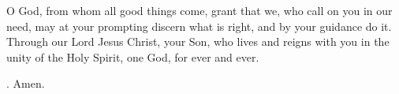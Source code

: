 \lettrine[lines=3]{O}{} God, from whom all good things come, 
grant that we, who call on you in our need,
may at your prompting discern what is right,
and by your guidance do it.
Through our Lord Jesus Christ, your Son,
who lives and reigns with you in the unity of the Holy Spirit,
one God, for ever and ever. \par \Rbar. Amen.
